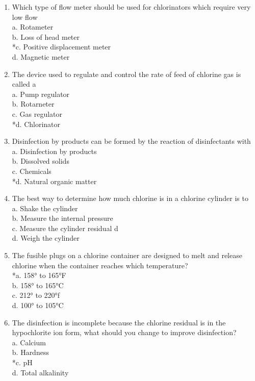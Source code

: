 \begin{enumerate}[1.]
\item Which type of flow meter should be used for chlorinators which require very low flow\\
a.  Rotameter\\
b.  Loss of head meter\\
*c.  Positive displacement meter\\
d.  Magnetic meter\\
\item The device used to regulate and control the rate of feed of chlorine gas is called a\\
a.  Pump regulator\\
b.  Rotarneter\\
c.  Gas regulator\\
*d.  Chlorinator\\
\item Disinfection by products can be formed by the reaction of disinfectants with\\
a.  Disinfection by products\\
b.  Dissolved solids\\
c.  Chemicals\\
*d.  Natural organic matter\\
\item The best way to determine how much chlorine is in a chlorine cylinder is to\\
a.  Shake the cylinder\\
b.  Measure the internal pressure\\
c. Measure the cylinder residual  d\\
d.  Weigh the cylinder\\
\item The fusible plugs on a chlorine container are designed to melt and release chlorine when the container reaches which temperature?\\
*a.  158° to 165°F\\
b.  158° to 165°C\\
c.  212° to 220°f\\
d.  100° to 105°C\\

\item The disinfection is incomplete because the chlorine residual is in the hypochlorite ion form, what should you change to improve disinfection?\\
a.  Calcium\\
b.  Hardness\\
*c.  pH\\
d. Total alkalinity\\


\end{enumerate}
